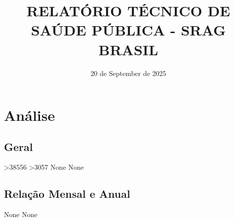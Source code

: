 \documentclass{article}%
\title{\textbf{RELATÓRIO TÉCNICO DE SAÚDE PÚBLICA - SRAG BRASIL}}%
\date{20 de September de 2025}%
\begin{document}
%
\normalsize%
\maketitle%
\section{Análise}%
\label{sec:Anlise}%
\subsection{Geral}%
\label{subsec:Geral}%
>38556\newline%
%
>3057\newline%
%
None\newline%
%
None\newline%

%
\subsection{Relação Mensal e Anual}%
\label{subsec:RelaoMensaleAnual}%
None\newline%
%
None\newline%
%
\end{document}
